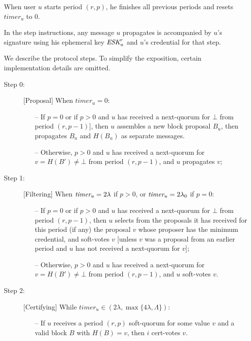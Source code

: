 \documentclass[../main.tex]{subfiles}
\begin{document}
When user $u$ starts period $(r,p)$, he finishes all previous periods and resets $timer_u$ to $0$.

In the step instructions, any message $u$ propagates is accompanied by $u$'s signature using his ephemeral key $\textit{ESK}^r_u$ and
$u$'s credential for that step.

We describe the protocol steps. To simplify the exposition, certain implementation details are omitted.

\begin{description}

\item[{\sc Step 0:}] [Proposal]
When $timer_u = 0$:
\begin{itemize}

\item[--] If $p = 0$ or if $p>0$ and $u$ has received a next-quorum for $\bot$ from period $(r,p-1)$], then $u$ assembles a new block proposal $B_u$, then propagates $B_u$ and $H(B_u)$ as separate messages.

\item[--] Otherwise, $p>0$ and $u$ has received a next-quorum for $v=H(B') \neq \bot$ from period $(r,p-1)$, and $u$ propagates $v$;

\end{itemize}

\item[{\sc Step 1:}] [Filtering] When $\textit{timer}_u = 2\lambda$ if $p>0$, or $\textit{timer}_u = 2\lambda_0$ if $p=0$:
\begin{itemize}

\item[--] If $p=0$ or if $p>0$ and $u$ has received a next-quorum for $\bot$ from period $(r,p-1)$,
then $u$ selects from the proposals it has received for this period (if any) the proposal $v$ whose proposer has the minimum credential, 
and soft-votes $v$ 
[unless $v$ was a proposal from an earlier period and $u$ has not received a next-quorum for $v$];

\item[--] Otherwise, $p>0$ and $u$ has received a next-quorum for $v=H(B') \neq \bot$ from period $(r,p-1)$, and $u$ soft-votes $v$.
\end{itemize}

\item[{\sc Step 2:}] [Certifying] While $timer_u\in (2\lambda, \max\{4\lambda,\Lambda\})$:

\begin{itemize}
\item[--] If $u$ receives a period $(r,p)$ soft-quorum for some value $v$ and a valid block $B$ with $H(B)=v$, then $i$ cert-votes $v$.
\end{itemize}


\end{description}
\end{document}
